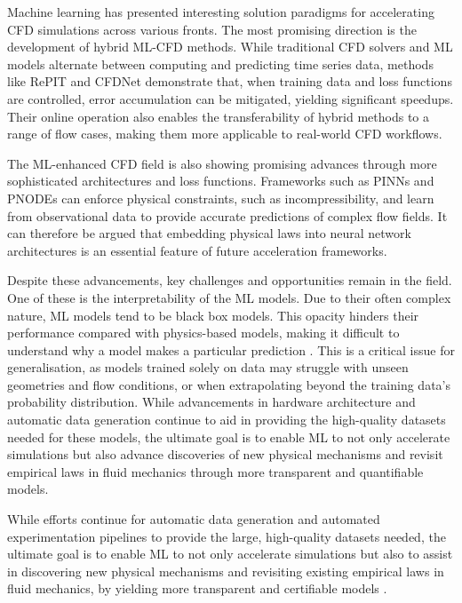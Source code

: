 Machine learning has presented interesting solution paradigms for accelerating CFD simulations across various fronts. The most promising direction is the development of hybrid ML-CFD methods. While traditional CFD solvers and ML models alternate between computing and predicting time series data, methods like RePIT \cite{Jeon2024} and CFDNet \cite{Obiols-Sales2020} demonstrate that, when training data and loss functions are controlled, error accumulation can be mitigated, yielding significant speedups. Their online operation also enables the transferability of hybrid methods to a range of flow cases, making them more applicable to real-world CFD workflows. 

The ML-enhanced CFD field is also showing promising advances through more sophisticated architectures and loss functions. Frameworks such as PINNs \cite{Raissi2019} and PNODEs \cite{Sholokhov2023} can enforce physical constraints, such as incompressibility, and learn from observational data to provide accurate predictions of complex flow fields. It can therefore be argued that embedding physical laws into neural network architectures is an essential feature of future acceleration frameworks.

Despite these advancements, key challenges and opportunities remain in the field. One of these is the interpretability of the ML models. Due to their often complex nature, ML models tend to be black box models. This opacity hinders their performance compared with physics-based models, making it difficult to understand why a model makes a particular prediction \cite{Vinuesa2022, Girimaji2024}. This is a critical issue for generalisation, as models trained solely on data may struggle with unseen geometries and flow conditions, or when extrapolating beyond the training data's probability distribution. While advancements in hardware architecture \cite{ansys2023multiGPU, Chen2009} and automatic data generation continue to aid in providing the high-quality datasets needed for these models, the ultimate goal is to enable ML to not only accelerate simulations but also advance discoveries of new physical mechanisms and revisit empirical laws in fluid mechanics through more transparent and quantifiable models. 

While efforts continue for automatic data generation and automated experimentation pipelines to provide the large, high-quality datasets needed, the ultimate goal is to enable ML to not only accelerate simulations but also to assist in discovering new physical mechanisms and revisiting existing empirical laws in fluid mechanics, by yielding more transparent and certifiable models \cite{Brunton2020, Vinuesa2022}.

